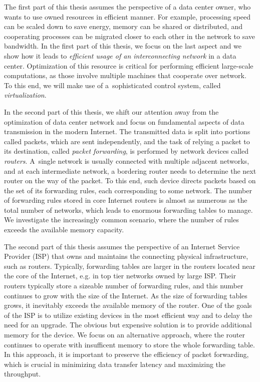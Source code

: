 \medskip
The first part of this thesis assumes the perspective of a data center owner, who wants to use owned resources in efficient manner.
For example, processing speed can be scaled down to save energy, memory can be shared or distributed, and cooperating processes can be migrated closer to each other in the network to save bandwidth.
In the first part of this thesis, we focus on the last aspect and we show how it leads to
\emph{efficient usage of an interconnecting network} in a data center.
Optimization of this resource is critical for performing efficient large-scale computations, as those involve multiple machines that cooperate over network.
To this end, we will make use of a~sophisticated control system, called \emph{virtualization}.

\medskip

In the second part of this thesis, we shift our attention away from the optimization of data center network and focus on fundamental aspects of data transmission in the modern Internet.
The transmitted data is split into portions called packets, which are sent independently, and the task of relying a packet to its destination, called \emph{packet forwarding}, is performed by network devices called \emph{routers}.
A~single network is usually connected with multiple adjacent networks, and at each intermediate network, a bordering router needs to determine the next router on the way of the packet.
To this end, such device directs packets based on the set of its forwarding rules, each corresponding to some network.
The number of forwarding rules stored in core Internet routers is almost as numerous as the total number of networks, which leads to enormous forwarding tables to manage.
We investigate the increasingly common scenario, where the number of rules exceeds the available memory capacity.

The second part of this thesis assumes the perspective of an Internet Service Provider (ISP) that owns and maintains the connecting physical infrastructure, such as routers.
Typically, forwarding tables are larger in the routers located near the core of the Internet, e.g. in top tier networks owned by large ISP.
Their routers typically store a sizeable number of forwarding rules, and this number continues to grow with the size of the Internet.
As the size of forwarding tables grows, it inevitably exceeds the available memory of the router.
One of the goals of the ISP is to utilize existing devices in the most efficient way and to delay the need for an upgrade.
The obvious but expensive solution is to provide additional memory for the device.
We focus on an alternative approach, where the router continues to operate with insufficent memory to store the whole forwarding table.
In this approach, it is important to preserve the efficiency of packet forwarding, which is crucial in minimizing data transfer latency and maximizing the throughput.



